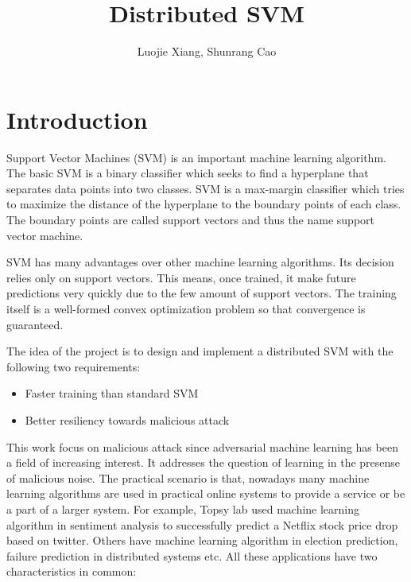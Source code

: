 \documentclass[10pt,conference,compsocconf,letterpaper]{IEEEtran}
\title{Distributed SVM}
\author{Luojie Xiang, Shunrang Cao}
\date{}
\begin{document}
\maketitle{}
\section{Introduction}

Support Vector Machines (SVM) is an important machine learning algorithm. The basic SVM is a binary classifier which seeks to find a hyperplane that separates data points into two classes. SVM is a max-margin classifier which tries to maximize the distance of the hyperplane to the boundary points of each class. The boundary points are called support vectors and thus the name support vector machine. 

SVM has many advantages over other machine learning algorithms. Its decision relies only on support vectors. This means, once trained, it make future predictions very quickly due to the few amount of support vectors. The training itself is a well-formed convex optimization problem so that convergence is guaranteed. 

The idea of the project is to design and implement a distributed SVM with the following two requirements:

\begin{itemize}
\item Faster training than standard SVM
\item Better resiliency towards malicious attack
\end{itemize}

This work focus on malicious attack since adversarial machine learning has been a field of increasing interest. It addresses the question of learning in the presense of malicious noise. The practical scenario is that, nowadays many machine learning algorithms are used in practical online systems to provide a service or be a part of a larger system. For example, Topsy lab used machine learning algorithm in sentiment analysis to successfully predict a Netflix stock price drop based on twitter. Others have machine learning algorithm in election prediction, failure prediction in distributed systems etc. All these applications have two characteristics in common:
\end{document}
